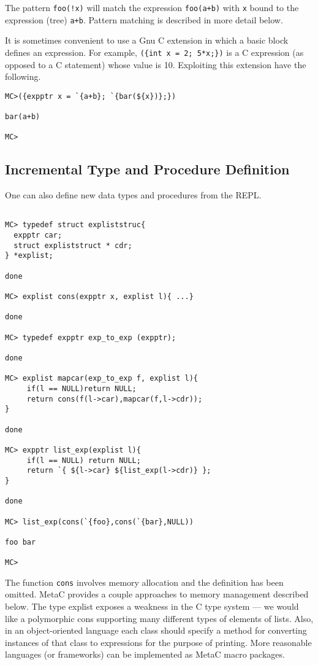 \documentclass{article}
\begin{document}
The pattern {\tt foo(!x)} will match the expression {\tt foo(a+b)} with {\tt x} bound to the expression (tree) {\tt a+b}.
Pattern matching is described in more detail below.

It is sometimes convenient to use a Gnu C extension in which a basic block defines an expression.  For example,
{\tt (\{int x = 2; 5*x;\})} is a C expression (as opposed to a C statement) whose value is 10.  Exploiting this extension have the following.

\begin{verbatim}
MC>({expptr x = `{a+b}; `{bar(${x})};})

bar(a+b)

MC>
\end{verbatim}

\subsection{Incremental Type and Procedure Definition}

One can also define new data types and procedures from the REPL.

\begin{verbatim}

MC> typedef struct expliststruc{
  expptr car;
  struct expliststruct * cdr;
} *explist;

done

MC> explist cons(expptr x, explist l){ ...}

done

MC> typedef expptr exp_to_exp (expptr);

done

MC> explist mapcar(exp_to_exp f, explist l){
     if(l == NULL)return NULL;
     return cons(f(l->car),mapcar(f,l->cdr));
}

done

MC> expptr list_exp(explist l){
     if(l == NULL) return NULL;
     return `{ ${l->car} ${list_exp(l->cdr)} };
}

done

MC> list_exp(cons(`{foo},cons(`{bar},NULL))

foo bar

MC>
\end{verbatim}

The function {\tt cons} involves memory allocation and the definition has been omitted.  MetaC provides a couple approaches to memory management described below.
The type explist exposes a weakness in the C type system --- we would like a polymorphic cons supporting many different types of elements
of lists. Also, in an object-oriented language each class should specify a method for converting instances of that class to expressions for the purpose of printing.
More reasonable languages (or frameworks) can be implemented as MetaC macro packages.
\end{document}

